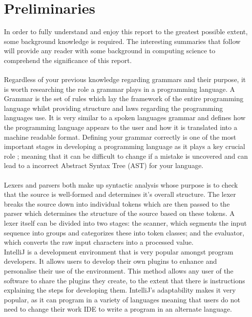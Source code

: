 \section{Preliminaries}
In order to fully understand and enjoy this report to the greatest possible extent, some background knowledge is required. The interesting summaries that follow will provide any reader with some background in computing science to comprehend the significance of this report.\\
\\
Regardless of your previous knowledge regarding grammars and their purpose, it is worth researching the role a grammar plays in a programming language. A Grammar is the set of rules which lay the framework of the entire programming language whilst providing structure and laws regarding the programming languages use. It is very similar to a spoken languages grammar and defines how the programming language appears to the user and how it is translated into a machine readable format. Defining your grammar correctly is one of the most important stages in developing a programming language as it plays a key crucial role ; meaning that it can be difficult to change if a mistake is uncovered and can lead to a incorrect Abstract Syntax Tree (AST) for your language. \\
\\
Lexers and parsers both make up syntactic analysis whose purpose is to check that the source is well-formed and determines it's overall structure. The lexer breaks the source down into individual tokens which are then passed to the parser which determines the structure of the source based on these tokens. A lexer itself can be divided into two stages: the scanner, which segments the input sequence into groups and categorizes these into token classes; and the evaluator, which converts the raw input characters into a processed value.
\\
IntelliJ is a development environment that is very popular amongst program developers. It allows users to develop their own plugins to enhance and personalise their use of the environment. This method allows any user of the software to share the plugins they create, to the extent that there is instructions explaining the steps for developing them. IntelliJ's adaptability makes it very popular, as it can program in a variety of languages meaning that users do not need to change their work IDE to write a program in an alternate language.\\
\\
